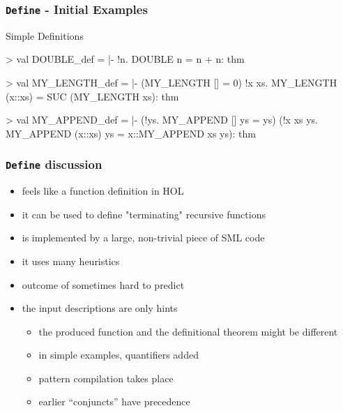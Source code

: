 \begin{frame}[fragile]
\frametitle{\texttt{Define} - Initial Examples}

\begin{block}{Simple Definitions}
\begin{semiverbatim}\scriptsize
> 
val DOUBLE_def =
   |- !n. DOUBLE n = n + n:
   thm

> 
val MY_LENGTH_def =
   |- (MY_LENGTH [] = 0) \holAnd{} !x xs. MY_LENGTH (x::xs) = SUC (MY_LENGTH xs):
   thm

> 
val MY_APPEND_def =
   |- (!ys. MY_APPEND [] ys = ys) \holAnd{}
      (!x xs ys. MY_APPEND (x::xs) ys = x::MY_APPEND xs ys):
   thm
\end{semiverbatim}
\end{block}             
\end{frame}


\begin{frame}
\frametitle{\texttt{Define} discussion}
\begin{itemize}
\item {} feels like a function definition in HOL
\item it can be used to define "terminating" recursive functions
\item {} is implemented by a large, non-trivial piece of SML code
\item it uses many heuristics
\item outcome of  sometimes hard to predict
\item the input descriptions are only hints
\begin{itemize}
\item the produced function and the definitional theorem might be different
\item in simple examples, quantifiers added
\item pattern compilation takes place
\item earlier ``conjuncts'' have precedence
\end{itemize}
\end{itemize}
\end{frame}

